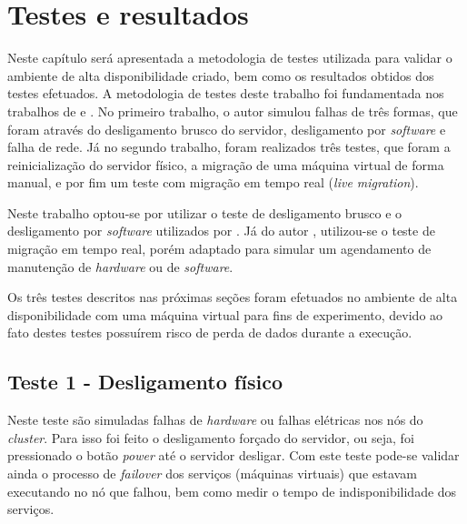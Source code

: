 \chapter{Testes e resultados}
\label{cap:resultados}

Neste capítulo será apresentada a metodologia de testes utilizada para validar o ambiente de alta disponibilidade criado, bem como os
resultados obtidos dos testes efetuados.
A metodologia de testes deste trabalho foi fundamentada nos trabalhos de \citet{reis2009} e \citet{goncalves2009}. No primeiro trabalho, 
o autor simulou falhas de três formas, que foram através do desligamento brusco do servidor, desligamento por \textit{software} e falha de rede. 
Já no segundo trabalho, foram realizados três testes, que foram a reinicialização do servidor físico, a migração de uma máquina virtual de forma
manual, e por fim um teste com migração em tempo real (\textit{live migration}).

Neste trabalho optou-se por utilizar o teste de desligamento brusco e o desligamento por \textit{software} utilizados por \citet{reis2009}.
Já do autor \citet{goncalves2009}, utilizou-se o teste de migração em tempo real, porém adaptado para simular um agendamento de manutenção de 
\textit{hardware} ou de \textit{software}.

Os três testes descritos nas próximas seções foram efetuados no ambiente de alta disponibilidade com uma máquina virtual para fins de experimento, 
devido ao fato destes testes possuírem risco de perda de dados durante a execução.

\section{Teste 1 - Desligamento físico}

Neste teste são simuladas falhas de \textit{hardware} ou falhas elétricas nos nós do \textit{cluster}. Para isso foi feito o desligamento 
forçado do servidor, ou seja, foi pressionado o botão \textit{power} até o servidor desligar.
Com este teste pode-se validar ainda o processo de \textit{failover} dos serviços (máquinas virtuais) que estavam executando no nó que falhou, 
bem como medir o tempo de indisponibilidade dos serviços. 

